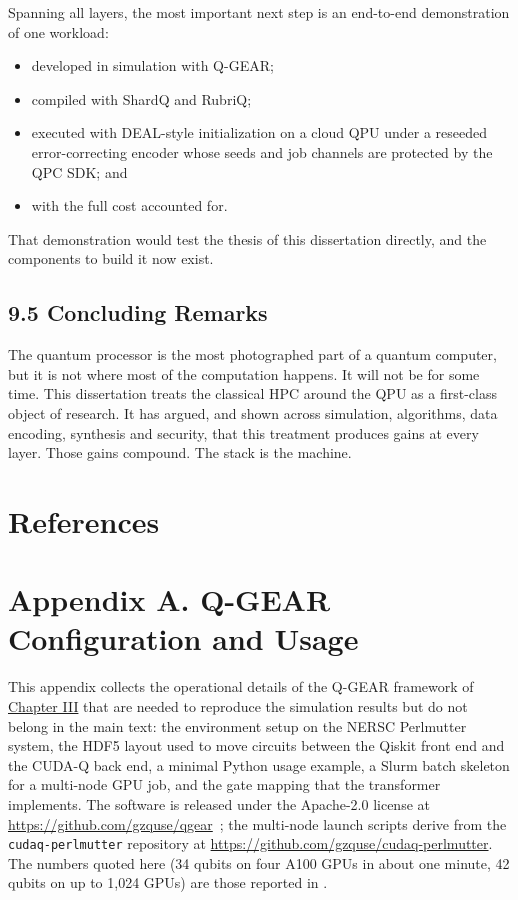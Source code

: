 \documentclass{report}
\theoremstyle{plain}
\theoremstyle{definition}
\theoremstyle{remark}
\begin{document}
Spanning all layers, the most important next step is an end-to-end demonstration of one workload:
\begin{itemize}
  \item developed in simulation with Q-GEAR;
  \item compiled with ShardQ and RubriQ;
  \item executed with DEAL-style initialization on a cloud QPU under a reseeded error-correcting encoder whose seeds and job channels are protected by the QPC SDK; and
  \item with the full cost accounted for.
\end{itemize}
That demonstration would test the thesis of this dissertation directly, and the components to build it now exist.

\section{9.5 Concluding Remarks}\label{sec:conclusion:remarks}

The quantum processor is the most photographed part of a quantum computer, but it is not where most of the computation happens. It will not be for some time. This dissertation treats the classical HPC around the QPU as a first-class object of research. It has argued, and shown across simulation, algorithms, data encoding, synthesis and security, that this treatment produces gains at every layer. Those gains compound. The stack is the machine.



\chapter*{References}




\chapter{Appendix A. Q-GEAR Configuration and Usage}\label{app:qgear}


This appendix collects the operational details of the Q-GEAR framework of \hyperref[ch:qgear]{Chapter III} that are needed to reproduce the simulation results but do not belong in the main text: the environment setup on the NERSC Perlmutter system, the HDF5 layout used to move circuits between the Qiskit front end and the CUDA-Q back end, a minimal Python usage example, a Slurm batch skeleton for a multi-node GPU job, and the gate mapping that the transformer implements. The software is released under the Apache-2.0 license at \url{https://github.com/gzquse/qgear}~\cite{guo2025qgearsoftware}; the multi-node launch scripts derive from the \texttt{cudaq-perlmutter} repository at \url{https://github.com/gzquse/cudaq-perlmutter}. The numbers quoted here (34 qubits on four A100 GPUs in about one minute, 42 qubits on up to 1,024 GPUs) are those reported in \cite{guo2025qgear}.
\end{document}
